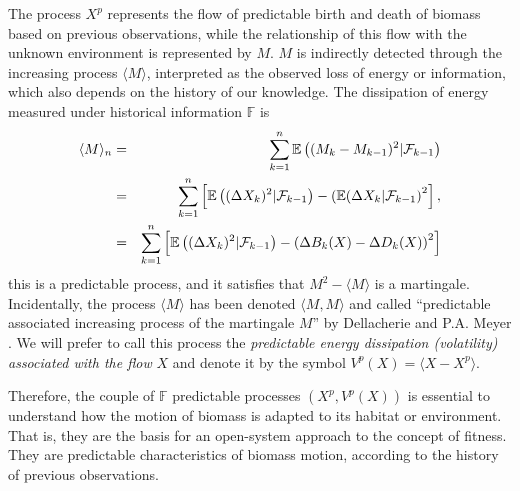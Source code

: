 \documentclass[12pt]{article}
\begin{document}
 The process $X^p$ represents the flow of predictable birth and death of biomass based on previous observations, while the relationship of this flow with the unknown environment is represented by $M$. $M$ is indirectly detected through the increasing process $\langle M\rangle$, interpreted as the observed loss of energy or information, which also depends on the history of our knowledge.   The dissipation of energy measured under historical information $\mathbb{F}$ is
\begin{eqnarray}\label{volatility}
    \langle M\rangle_n&=&\sum_{k=1}^n\mathbb{E}\left((M_k-M_{k-1})^2|\mathcal{F}_{k-1}\right)\nonumber\\
    &=&\sum_{k=1}^n\left[\mathbb{E}\left ((\Delta X_k)^2|\mathcal{F}_{k-1}\right)-\left(\mathbb{E}(\Delta X_k|\mathcal{F}_{k-1}\right)^2\right],\\
    &=&\sum_{k=1}^n\left[\mathbb{E}\left ((\Delta X_k)^2|\mathcal{F}_{k-1}\right)-\left(\Delta B_k(X)-\Delta D_k(X)\right)^2\right]\nonumber
\end{eqnarray}
this is a predictable process, and it satisfies that $M^2-\langle M\rangle$ is a martingale. Incidentally, the process $\langle M\rangle$ has been denoted $\langle M,M\rangle$ and called ``predictable associated increasing process of the martingale $M$'' by Dellacherie and P.A. Meyer \cite{Dellacherie-Meyer}. We will prefer to call this process the\textit{ predictable energy dissipation (volatility) associated with the flow} $X$ and denote it by the symbol $V^p(X)=\langle X-X^p\rangle$.

Therefore, the couple of $\mathbb{F}$ predictable processes $(X^p,V^p(X))$ is essential to understand how the motion of biomass is adapted to its habitat or environment. That is, they are the basis for an open-system approach to the concept of fitness. They are predictable characteristics of biomass motion, according to the history of previous observations.
\end{document}
